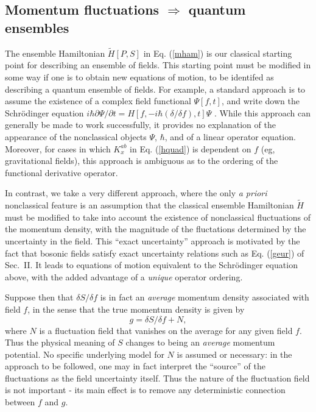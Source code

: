 \documentclass[a4paper,preprint, showpacs, aps, draft]{revtex4}
\begin{document}
{\subsection{Momentum fluctuations $\Rightarrow$ quantum ensembles}

The ensemble Hamiltonian $\tilde{H}[P,S]$ in Eq. (\ref{mham}) is our classical
starting point for describing an ensemble of fields.  This starting
point must be modified in some way if one is to obtain new equations of
motion, to be identifed as describing a quantum 
ensemble of fields.  For example, a standard approach is to assume the
existence of a complex field functional $\Psi[f,t]$, and write down the
Schr\"{o}dinger equation $i\hbar\partial\Psi/\partial t = 
H[f,-i\hbar(\delta/\delta f),t]\Psi$ \cite{schweber}.  While this approach can
generally be made to work successfully, it provides no explanation of
the appearance of the nonclassical objects 
$\Psi$, $\hbar$, and of a linear operator equation.  Moreover,
for cases in which $K^{ab}_x$ in Eq. (\ref{hquad}) is dependent on $f$
(eg, gravitational fields),
this approach is ambiguous as to the ordering of the functional
derivative operator.  

In contrast, we take a very different approach, where the only
{\it a priori} nonclassical feature is an 
assumption that the classical ensemble Hamiltonian $\tilde{H}$ must be
modified to 
take into account the existence of nonclassical fluctuations of the momentum
density, with the magnitude of the fluctations determined by the
uncertainty in the field. This ``exact uncertainty'' approach is
motivated by the fact that bosonic fields satisfy exact uncertainty
relations such as Eq. (\ref{geur}) of Sec.~II. It leads to equations of
motion equivalent to the Schr\"{o}dinger equation above, with the added
advantage of a {\it unique} operator ordering.

Suppose then that $\delta S/\delta f$ is in fact an {\it average}
momentum density associated with field $f$, in the sense that the true momentum
density is given by 
\begin{equation} \label{noise}
g = \delta S/\delta f + N,
\end{equation}
where $N$ is a fluctuation field that vanishes on the average for any
given field $f$. Thus the physical meaning of $S$ changes to being an
{\it average} momentum potential. 
No specific underlying model for $N$ is assumed or necessary: in the approach
to be followed, one may in fact
interpret the ``source'' of the fluctuations as the field
uncertainty itself. Thus the nature of the fluctuation field is not
important -
its main effect is to remove any deterministic connection between $f$
and $g$. 

}
\end{document}
